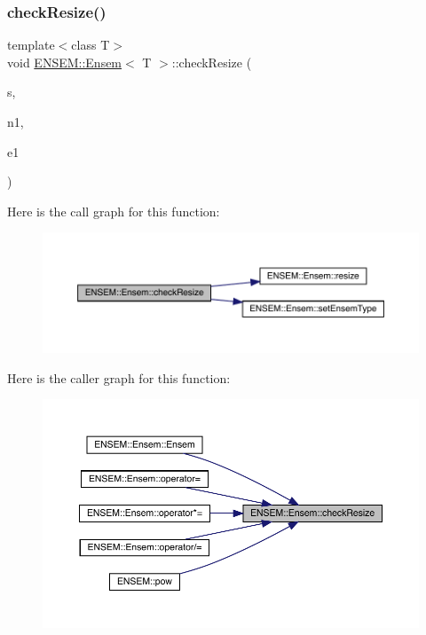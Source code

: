 \subsubsection{\texorpdfstring{checkResize()}{checkResize()}\hspace{0.1cm}{\footnotesize\ttfamily [2/6]}}
{\footnotesize\ttfamily template$<$class T$>$ \\
void \mbox{\hyperlink{classENSEM_1_1Ensem}{E\+N\+S\+E\+M\+::\+Ensem}}$<$ T $>$\+::check\+Resize (\begin{DoxyParamCaption}\item[{const char $\ast$}]{s,  }\item[{int}]{n1,  }\item[{\mbox{\hyperlink{namespaceENSEM_a2dc2c4a26884f343471e52f23479ddbe}{Ensem\+Type\+\_\+t}}}]{e1 }\end{DoxyParamCaption})\hspace{0.3cm}{\ttfamily [inline]}}

Here is the call graph for this function\+:
\nopagebreak
\begin{figure}[H]
\begin{center}
\leavevmode
\includegraphics[width=350pt]{d7/d3e/classENSEM_1_1Ensem_a1cebe5f8cc3d849d6b4dc7d9d10c636b_cgraph}
\end{center}
\end{figure}
Here is the caller graph for this function\+:\nopagebreak
\begin{figure}[H]
\begin{center}
\leavevmode
\includegraphics[width=350pt]{d7/d3e/classENSEM_1_1Ensem_a1cebe5f8cc3d849d6b4dc7d9d10c636b_icgraph}
\end{center}
\end{figure}
\mbox{\label{classENSEM_1_1Ensem_acb139b6e03db52a9190de9ea4830addb}} 
